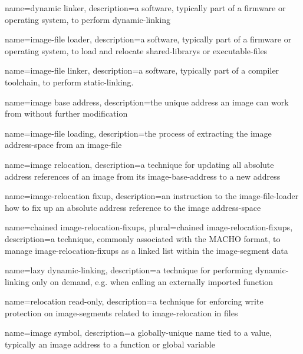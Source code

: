 {
  name={dynamic linker},
  description={a software, typically part of a \gls{firmware} or operating system, to perform \gls{dynamic-linking}}
}

{
  name={\gls{image-file} loader},
  description={a software, typically part of a \gls{firmware} or operating system, to load and relocate \glspl{shared-library} or \glspl{executable-file}}
}

{
  name={\gls{image-file} linker},
  description={a software, typically part of a compiler toolchain, to perform \gls{static-linking}.}
}

{
  name={\gls{image} base address},
  description={the unique address an \gls{image} can work from without further modification}
}

{
  name={\gls{image-file} loading},
  description={the process of extracting the \gls{image} \gls{address-space} from an \gls{image-file}}
}

{
  name={\gls{image} relocation},
  description={a technique for updating all absolute address references of an \gls{image} from its \gls{image-base-address} to a new address}
}

{
  name={\gls{image-relocation} fixup},
  description={an instruction to the \gls{image-file-loader} how to fix up an absolute address reference to the \gls{image} \gls{address-space}}
}

{
  name={chained \glspl{image-relocation-fixup}},
  plural={chained \glspl{image-relocation-fixup}},
  description={a technique, commonly associated with the \gls{MACHO} format, to manage \glspl{image-relocation-fixup} as a linked list within the \gls{image-segment} data}
}

{
  name={lazy \gls{dynamic-linking}},
  description={a technique for performing \gls{dynamic-linking} only on demand, e.g. when calling an externally imported function}
}

{
  name={relocation read-only},
  description={a technique for enforcing write protection on \glspl{image-segment} related to \gls{image-relocation} in  files}
}

{
  name={\gls{image} symbol},
  description={a globally-unique name tied to a value, typically an \gls{image} address to a function or global variable}
}

